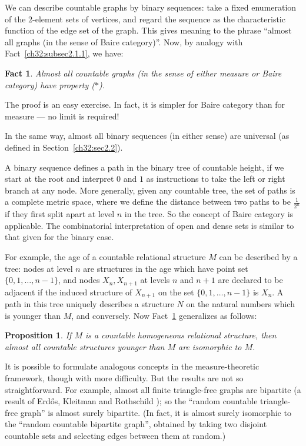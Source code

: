 \documentclass[12pt]{article}
\newtheorem{fact}{Fact}
\newtheorem{proposition}{Proposition}
\begin{document}
We can describe countable graphs by binary sequences: take a fixed
enumeration of the $2$-element sets of vertices, and regard the
sequence as the characteristic function of the edge set of the
graph. This gives meaning to the phrase ``almost all graphs (in the
sense of Baire category)''. Now, by analogy with
Fact~\ref{ch32:subsec2.1.1}, we have:

\begin{fact}\label{ch32:subsec2.7.1} 
Almost all countable graphs (in the
sense of either measure or Baire category) have property ($\ast$).
\end{fact}

The proof is an easy exercise. In fact, it is simpler for Baire
category than for measure --- no limit is required!

In the same way, almost all binary sequences (in either sense) are
universal (as defined in Section~\ref{ch32:sec2.2}).

A binary sequence defines a path in the binary tree of countable
height, if we start at the root and interpret $0$ and $1$ as instructions
to take the left or right branch at any node. More generally, given
any countable tree, the set of paths is a complete metric space,
where we define the distance between two paths to be $\frac{1}{2^n}$
if they first split apart at level $n$ in the tree. So the concept
of Baire category is applicable. The combinatorial interpretation of
open and dense sets is similar to that given for the binary case.

For example, the age of a countable relational structure $M$ can be
described by a tree: nodes at level $n$ are structures in the age
which have point set $\{0, 1, \ldots,  n-1\}$, and nodes $X_n,
X_{n +1}$ at levels $n$ and $n +1$ are declared to be adjacent if
the induced structure of $X_{n+1}$ on the set $\{0, 1, \ldots,
n-1\}$ is $X_n$. A path in this tree uniquely describes a structure
$N$ on the natural numbers which is younger than $M$, and
conversely. Now Fact~\ref{ch32:subsec2.7.1} generalizes as follows:

\begin{proposition}\label{ch32:prop7.1} 
If $M$ is a countable homogeneous relational
structure, then almost all countable structures younger than $M$ are
isomorphic to $M$.
\end{proposition}

It is possible to formulate analogous concepts in the
measure-theoretic framework, though with more difficulty. But the
results are not so straightforward. For example, almost all finite
triangle-free graphs are bipartite (a result of Erd\H{o}s, Kleitman
and Rothschild \cite{ch32:bib17}); so the ``random countable
triangle-free graph'' is almost surely bipartite. (In fact, it is
almost surely isomorphic to the ``random countable bipartite graph'',
obtained by taking two disjoint countable sets and selecting edges
between them at random.)
\end{document}
